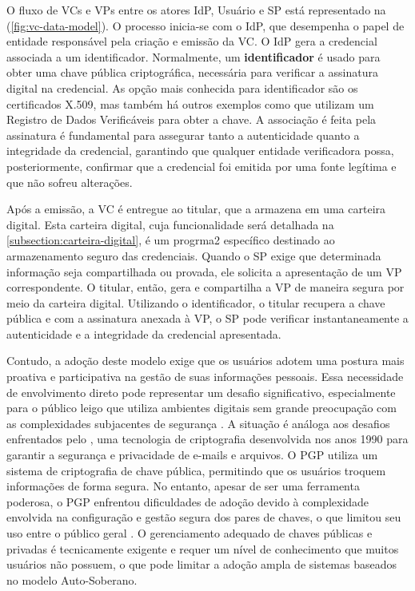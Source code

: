 O fluxo de \acs{VC}s e \acs{VP}s entre os atores \acs{IdP}, Usuário e \acs{SP} está representado na  (\autoref{fig:vc-data-model}). O processo inicia-se com o \acs{IdP}, que desempenha o papel de entidade responsável pela criação e emissão da \acs{VC}. O \acs{IdP} gera a credencial associada a um identificador.  Normalmente, um \textbf{identificador} é usado para obter uma chave pública criptográfica, necessária para verificar a assinatura digital na credencial. As opção mais conhecida para identificador são os certificados X.509, mas também há outros exemplos como  que utilizam um Registro de Dados Verificáveis para obter a chave. A associação é feita pela assinatura é fundamental para assegurar tanto a autenticidade quanto a integridade da credencial, garantindo que qualquer entidade verificadora possa, posteriormente, confirmar que a credencial foi emitida por uma fonte legítima e que não sofreu alterações.
 
Após a emissão, a \acs{VC} é entregue ao titular, que a armazena em uma carteira digital. Esta carteira digital, cuja funcionalidade será detalhada na \autoref{subsection:carteira-digital}, é um progrma2 específico destinado ao armazenamento seguro das credenciais. Quando o \acs{SP} exige que determinada informação seja compartilhada ou provada, ele solicita a apresentação de um \acs{VP} correspondente. O titular, então, gera e compartilha a \acs{VP} de maneira segura por meio da carteira digital. Utilizando o identificador, o titular recupera a chave pública e com a assinatura anexada à \acs{VP}, o \acs{SP} pode verificar instantaneamente a autenticidade e a integridade da credencial apresentada.



Contudo, a adoção deste modelo exige que os usuários adotem uma postura mais proativa e participativa na gestão de suas informações pessoais. Essa necessidade de envolvimento direto pode representar um desafio significativo, especialmente para o público leigo que utiliza ambientes digitais sem grande preocupação com as complexidades subjacentes de segurança \cite{revisao-ssi-frederico}. A situação é análoga aos desafios enfrentados pelo , uma tecnologia de criptografia desenvolvida nos anos 1990 para garantir a segurança e privacidade de e-mails e arquivos. O \acs{PGP} utiliza um sistema de criptografia de chave pública, permitindo que os usuários troquem informações de forma segura. No entanto, apesar de ser uma ferramenta poderosa, o \acs{PGP} enfrentou dificuldades de adoção devido à complexidade envolvida na configuração e gestão segura dos pares de chaves, o que limitou seu uso entre o público geral \cite{allen2016}. O gerenciamento adequado de chaves públicas e privadas é tecnicamente exigente e requer um nível de conhecimento que muitos usuários não possuem, o que pode limitar a adoção ampla de sistemas baseados no modelo Auto-Soberano.


